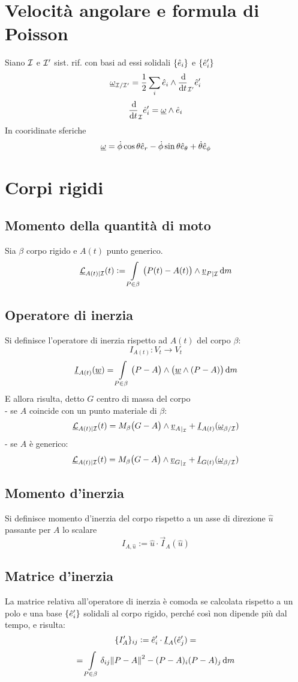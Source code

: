 \documentclass[11pt,landscape]{article}
\begin{document}
\begin{multicols}{3}
\section{Velocità angolare e formula di Poisson}
        Siano $\mathcal{I}$ e $\mathcal{I}'$ sist. rif. con basi ad essi solidali $\{\hat{e}_i\}$ e $\{\hat{e}_i'\}$
    $$\vec{\omega}_{\I/\I'} = \frac 1 2 \sum_i \e_i \wedge \ddt_{\I'} \e_i'$$
    $$ \ddt_\I \e_i' = \vec{\omega} \wedge \e_i$$
    In cooridinate sferiche $$ \underline{\omega} = \dot \phi \cos \theta \hat{e}_r - \dot \phi \sin \theta \hat{e}_\theta + \dot \theta \hat{e}_\phi $$

\section{Corpi rigidi}
    \subsection{Momento della quantità di moto}
    Sia $\beta$ corpo rigido e $A(t)$ punto generico.
    $$ \vec{\mathcal{L}}_{A(t)\rvert{\I}}(t) := \int \limits_{P\in \beta} \big (P(t) - A(t) \big) \wedge {\vec{v}_P}_{\rvert \I}\dif m$$
    \subsection{Operatore di inerzia}
    Si definisce l'operatore di inerzia rispetto ad $A(t)$ del corpo $\beta$:
        $$ I_{A(t)} : V_t \longrightarrow V_t$$
        $$ \vec{I}_{A(t)}(\vec w) = \int \limits_{P \in \beta} \big( P- A\big) \wedge \big( \vec w \wedge (P-A)\big) \dif m$$
    E allora risulta, detto $G$ centro di massa del corpo \\
    - se $A$ coincide con un punto materiale di $\beta$:
        $$ \underline{\mathcal{L}}_{A(t)\rvert{\mathcal{I}}}(t) = M_\beta \big(G - A \big) \wedge {\underline{v}_A}_{\rvert_{\mathcal{I}}} + \underline{I}_{A(t)}(\underline{\omega} _{\beta/\mathcal{I}})$$
    - se $A$ è generico:
        $$ \underline{\mathcal{L}}_{A(t)\rvert{\mathcal{I}}}(t) = M_\beta \big(G - A \big) \wedge {\underline{v}_G}_{\rvert_{\mathcal{I}}} + \underline{I}_{G(t)}(\underline{\omega} _{\beta/\mathcal{I}})$$
    \subsection{Momento d'inerzia}
    Si definisce momento d'inerzia del corpo rispetto a un asse di direzione $\hat u$ passante per $A$ lo scalare 
    $$ I_{A, \hat u} := \hat u \cdot \vec{I}_A(\hat u)$$
    \subsection{Matrice d'inerzia}
    La matrice relativa all'operatore di inerzia è comoda se calcolata rispetto a un polo e una base $\{\hat{e}_i'\}$ solidali al corpo rigido, perché così non dipende più dal tempo, e risulta:
        $$\{I'_A\}_{ij} := \hat{e}_i' \cdot \underline{I}_A(\hat{e}_j') = $$ 
        $$ = \int \limits_{P \in \beta} \delta_{ij} \norm{P-A}^2 - (P-A)_i (P-A)_j \dif m$$

\end{multicols}
\end{document}
